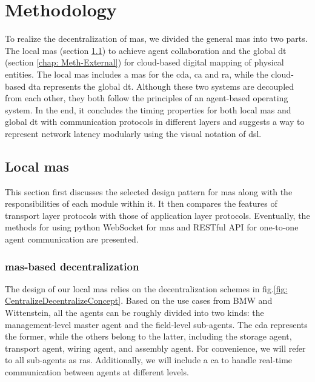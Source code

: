 \chapter{Methodology}\label{chap: Meth}%
To realize the decentralization of \gls{mas}, we divided the general \gls{mas} into 
two parts. The local \gls{mas} (section \ref{chap: Meth-Internal}) to achieve agent 
collaboration and the global \gls{dt} (section \ref{chap: Meth-External})
for cloud-based digital mapping of physical entities. The local \gls{mas} 
includes a \gls{mas} for the \gls{cda}, \gls{ca} and \gls{ra}, 
while the cloud-based \gls{dta} represents the global \gls{dt}. 
Although these two systems are decoupled from each other, 
they both follow the principles of an agent-based operating system. 
In the end, it concludes the timing properties for both 
local \gls{mas} and global \gls{dt} with communication protocols in 
different layers and suggests a way to represent 
network latency modularly using the visual notation of \gls{dsl}. 




\section{Local \gls{mas}}\label{chap: Meth-Internal}%

This section first discusses the selected design pattern for \gls{mas} along 
with the responsibilities of each module within it.
It then compares the features of transport layer protocols with those of 
application layer protocols. 
Eventually, the methods for using python WebSocket for \gls{mas} and 
RESTful API for one-to-one agent communication are presented. 


\subsection{\gls{mas}-based decentralization}
The design of our local \gls{mas} relies on the decentralization 
schemes in fig.\ref{fig: CentralizeDecentralizeConcept}. 
Based on the use cases from BMW and Wittenstein, all the agents can be roughly 
divided into two kinds: the management-level master agent and the field-level sub-agents. 
The \gls{cda} represents the former, while the others belong to the latter, 
including the storage agent, transport agent, wiring agent, and assembly agent. For 
convenience, we will refer to all sub-agents as \gls{ras}. Additionally, we will include 
a \gls{ca} to handle real-time communication between agents at different levels. 


